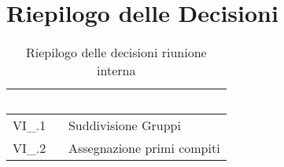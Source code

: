 \section{Riepilogo delle Decisioni}


\begin{table}[!htbp]
\renewcommand{\arraystretch}{1.5}
\begin{tabular}{m{}<{\centering}  m{}<{\centering}}
\rowcolor{darkblue} \textcolor{white}{\textbf{Codice}} & \textcolor{white}{\textbf{Decisione}} \\
\hline
VI\_\D{}.1 & Suddivisione Gruppi\\
\rowcolor{gray!25} VI\_\D{}.2 & Assegnazione primi compiti \\
\end{tabular}
\caption{Riepilogo delle decisioni riunione interna \D{}}
\end{table}